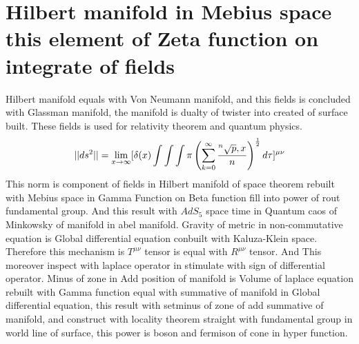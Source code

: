 \documentclass{jsarticle}
\begin{document}
{\section{Hilbert manifold in Mebius space \\
        this element of Zeta function on integrate of fields}

 Hilbert manifold equals with Von Neumann manifold, and this fields is concluded with Glassman manifold,
the manifold is dualty of twister into created of surface built.
These fields is used for relativity theorem and quantum physics.
$$ ||ds^2|| = \lim_{x \to \infty} [\delta(x) \int \int \int \pi \left( \sum_{k=0}^{\infty}
		{{}^n\sqrt{p},x \over n} \right)
^{1 \over 2}d \tau]^{\mu\nu} $$
  This norm is component of fields in Hilbert manifold of space theorem rebuilt with
Mebius space in Gamma Function on Beta function fill into power of rout fundamental
group.
And this result with $AdS_5$ space time in Quantum caos of Minkowsky of manifold in
abel manifold.
Gravity of metric in non-commutative equation is Global differential equation
conbuilt with Kaluza-Klein space. Therefore this mechanism is $T^{\mu\nu}$ tensor
is equal with $R^{\mu\nu}$ tensor. And This moreover inspect with laplace operator
in stimulate with sign of differential operator.
Minus of zone in Add position of manifold is Volume of laplace equation rebuilt with
Gamma function equal with summative of manifold in Global differential equation,
this result with setminus of zone of add summative of manifold, and construct with
locality theorem straight with fundamental group in world line of surface, this
power is boson and fermison of cone in hyper function.

}
\end{document}
